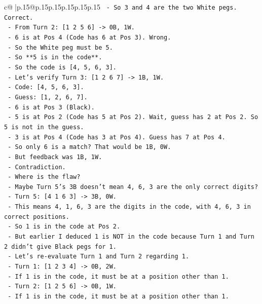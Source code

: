 \documentclass{article}
\begin{document}
{\begin{supertabular}{c@{$\;$}|p{.15\linewidth}@{}p{.15\linewidth}p{.15\linewidth}p{.15\linewidth}p{.15\linewidth}p{.15\linewidth}}
{{{\texttt{      {-} So 3 and 4 are the two White pegs. Correct.} \\
\texttt{    {-} From Turn 2: {[}1 2 5 6{]} {-}> 0B, 1W.} \\
\texttt{      {-} 6 is at Pos 4 (Code has 6 at Pos 3). Wrong.} \\
\texttt{      {-} So the White peg must be 5.} \\
\texttt{      {-} So **5 is in the code**.} \\
\texttt{      {-} So the code is {[}4, 5, 6, 3{]}.} \\
\texttt{    {-} Let's verify Turn 3: {[}1 2 6 7{]} {-}> 1B, 1W.} \\
\texttt{      {-} Code: {[}4, 5, 6, 3{]}.} \\
\texttt{      {-} Guess: {[}1, 2, 6, 7{]}.} \\
\texttt{      {-} 6 is at Pos 3 (Black).} \\
\texttt{      {-} 5 is at Pos 2 (Code has 5 at Pos 2). Wait, guess has 2 at Pos 2. So 5 is not in the guess.} \\
\texttt{      {-} 3 is at Pos 4 (Code has 3 at Pos 4). Guess has 7 at Pos 4.} \\
\texttt{      {-} So only 6 is a match? That would be 1B, 0W.} \\
\texttt{      {-} But feedback was 1B, 1W.} \\
\texttt{      {-} Contradiction.} \\
\texttt{  {-} Where is the flaw?} \\
\texttt{  {-} Maybe Turn 5's 3B doesn't mean 4, 6, 3 are the only correct digits?} \\
\texttt{  {-} Turn 5: {[}4 1 6 3{]} {-}> 3B, 0W.} \\
\texttt{  {-} This means 4, 1, 6, 3 are the digits in the code, with 4, 6, 3 in correct positions.} \\
\texttt{  {-} So 1 is in the code at Pos 2.} \\
\texttt{  {-} But earlier I deduced 1 is NOT in the code because Turn 1 and Turn 2 didn't give Black pegs for 1.} \\
\texttt{  {-} Let's re{-}evaluate Turn 1 and Turn 2 regarding 1.} \\
\texttt{  {-} Turn 1: {[}1 2 3 4{]} {-}> 0B, 2W.} \\
\texttt{    {-} If 1 is in the code, it must be at a position other than 1.} \\
\texttt{  {-} Turn 2: {[}1 2 5 6{]} {-}> 0B, 1W.} \\
\texttt{    {-} If 1 is in the code, it must be at a position other than 1.} \\
}}}
\end{supertabular}}
\end{document}
